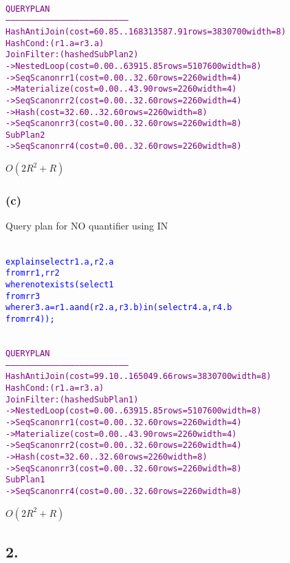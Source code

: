\documentclass[10pt]{article}
\begin{document}
{\footnotesize
\begin{alltt}
\textcolor{purple}{
                                QUERY PLAN
--------------------------------------------------------------------------
 Hash Anti Join  (cost=60.85..168313587.91 rows=3830700 width=8)
   Hash Cond: (r1.a = r3.a)
   Join Filter: (hashed SubPlan 2)
   ->  Nested Loop  (cost=0.00..63915.85 rows=5107600 width=8)
         ->  Seq Scan on r r1  (cost=0.00..32.60 rows=2260 width=4)
         ->  Materialize  (cost=0.00..43.90 rows=2260 width=4)
               ->  Seq Scan on r r2  (cost=0.00..32.60 rows=2260 width=4)
   ->  Hash  (cost=32.60..32.60 rows=2260 width=8)
         ->  Seq Scan on r r3  (cost=0.00..32.60 rows=2260 width=8)
   SubPlan 2
     ->  Seq Scan on r r4  (cost=0.00..32.60 rows=2260 width=8)
}
\end{alltt}
}
$O(2R^2+R)$
\subsubsection*{(c)}
Query plan for NO quantifier using IN

\begin{alltt}\textcolor{blue}{
explain select r1.a,r2.a
        from r r1,r r2
        where not exists(select 1
				        from r r3
				        where r3.a=r1.a and (r2.a,r3.b) in (select r4.a,r4.b
												   from r r4));
}
\end{alltt}

{\footnotesize
\begin{alltt}
\textcolor{purple}{
                                QUERY PLAN
--------------------------------------------------------------------------
 Hash Anti Join  (cost=99.10..165049.66 rows=3830700 width=8)
   Hash Cond: (r1.a = r3.a)
   Join Filter: (hashed SubPlan 1)
   ->  Nested Loop  (cost=0.00..63915.85 rows=5107600 width=8)
         ->  Seq Scan on r r1  (cost=0.00..32.60 rows=2260 width=4)
         ->  Materialize  (cost=0.00..43.90 rows=2260 width=4)
               ->  Seq Scan on r r2  (cost=0.00..32.60 rows=2260 width=4)
   ->  Hash  (cost=32.60..32.60 rows=2260 width=8)
         ->  Seq Scan on r r3  (cost=0.00..32.60 rows=2260 width=8)
   SubPlan 1
     ->  Seq Scan on r r4  (cost=0.00..32.60 rows=2260 width=8)
}
\end{alltt}
}

$O(2R^2+R)$

\subsection*{2.}
\end{document}
